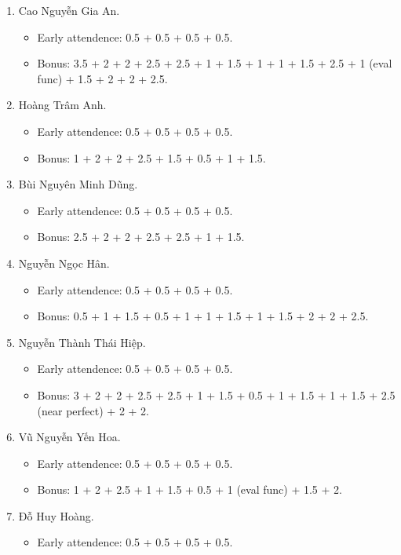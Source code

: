 \documentclass{article}
\begin{document}
\begin{enumerate}
	\item {\sc Cao Nguyễn Gia An.}
	\begin{itemize}
		\item Early attendence: 0.5 + 0.5 + 0.5 + 0.5.
		\item Bonus: 3.5 + 2 + 2 + 2.5 + 2.5 + 1 + 1.5 + 1 + 1 + 1.5 + 2.5 + 1 (eval func) + 1.5 + 2 + 2 + 2.5.
	\end{itemize}
	\item {\sc Hoàng Trâm Anh.}
	\begin{itemize}
		\item Early attendence: 0.5 + 0.5 + 0.5 + 0.5.
		\item Bonus: 1 + 2 + 2 + 2.5 + 1.5 + 0.5 + 1 + 1.5.
	\end{itemize}
	\item {\sc Bùi Nguyên Minh Dũng.}
	\begin{itemize}
		\item Early attendence: 0.5 + 0.5 + 0.5 + 0.5.
		\item Bonus: 2.5 + 2 + 2 + 2.5 + 2.5 + 1 + 1.5.
	\end{itemize}
	\item {\sc Nguyễn Ngọc Hân.}
	\begin{itemize}
		\item Early attendence: 0.5 + 0.5 + 0.5 + 0.5.
		\item Bonus: 0.5 + 1 + 1.5 + 0.5 + 1 + 1 + 1.5 + 1 + 1.5 + 2 + 2 + 2.5.
	\end{itemize}
	\item {\sc Nguyễn Thành Thái Hiệp.}
	\begin{itemize}
		\item Early attendence: 0.5 + 0.5 + 0.5 + 0.5.
		\item Bonus: 3 + 2 + 2 + 2.5 + 2.5 + 1 + 1.5 + 0.5 + 1 + 1.5 + 1 + 1.5 + 2.5 (near perfect) + 2 + 2.
	\end{itemize}
	\item {\sc Vũ Nguyễn Yến Hoa.}
	\begin{itemize}
		\item Early attendence: 0.5 + 0.5 + 0.5 + 0.5.
		\item Bonus: 1 + 2 + 2.5 + 1 + 1.5 + 0.5 + 1 (eval func) + 1.5 + 2.
	\end{itemize}
	\item {\sc Đỗ Huy Hoàng.}
	\begin{itemize}
		\item Early attendence: 0.5 + 0.5 + 0.5 + 0.5.

\end{itemize}
\end{enumerate}
\end{document}
